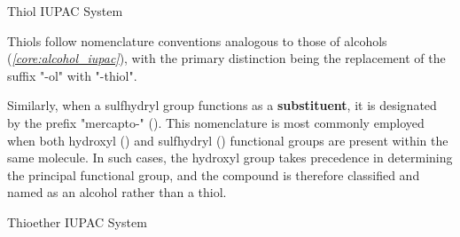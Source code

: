 \documentclass[10pt]{article}
\begin{document}
    \begin{core}{Thiol IUPAC System}

      Thiols follow nomenclature conventions analogous to those of alcohols (\textit{\autoref{core:alcohol_iupac}}), with the primary distinction being the replacement of the suffix "-ol" with "-thiol".

      \vspace{-1.6cm}

      Similarly, when a sulfhydryl group functions as a \textbf{substituent}, it is designated by the prefix "mercapto-" (). This nomenclature is most commonly employed when both hydroxyl () and sulfhydryl () functional groups are present within the same molecule. In such cases, the hydroxyl group takes precedence in determining the principal functional group, and the compound is therefore classified and named as an alcohol rather than a thiol.


    \end{core}

    \begin{core}{Thioether IUPAC System}


    \end{core}
\end{document}
